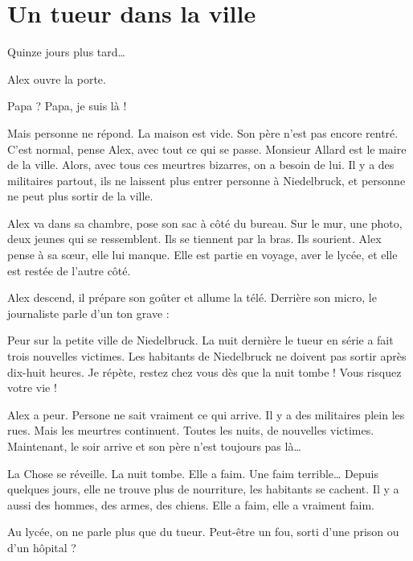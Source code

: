\chapter{Un tueur dans la ville}
Quinze jours plus tard\ldots{}

Alex ouvre la porte.

\og Papa ? Papa, je suis là ! \fg{}

Mais personne ne répond. La maison est vide. Son père n'est pas encore rentré. C'est normal, pense Alex, avec tout ce qui se
passe. Monsieur Allard est le maire de la ville. Alors, avec tous ces meurtres bizarres, on a besoin de lui. Il y a des militaires
partout, ils ne laissent plus entrer personne à Niedelbruck, et personne ne peut plus sortir de la ville.

Alex va dans sa chambre, pose son sac à côté du bureau. Sur le mur, une photo, deux jeunes qui se ressemblent. Ils se tiennent par
la bras. Ils sourient. Alex pense à sa s\oe{}ur, elle lui manque. Elle est partie en voyage, aver le lycée, et elle est restée de
l'autre côté.

Alex descend, il prépare son goûter et allume la télé. Derrière son micro, le journaliste parle d'un ton grave :

\og Peur sur la petite ville de Niedelbruck. La nuit dernière le tueur en série a fait trois nouvelles victimes. Les habitants de
Niedelbruck ne doivent pas sortir après dix-huit heures. Je répète, restez chez vous dès que la nuit tombe ! Vous risquez votre
vie !\fg{}

Alex a peur. Persone ne sait vraiment ce qui arrive. Il y a des militaires plein les rues. Mais les meurtres continuent. Toutes
les nuits, de nouvelles victimes. Maintenant, le soir arrive et son père n'est toujours pas là\ldots{}

La Chose se réveille. La nuit tombe. Elle a faim. Une faim terrible\ldots{} Depuis quelques jours, elle ne trouve plus de
nourriture, les habitants se cachent. Il y a aussi des hommes, des armes, des chiens. Elle a faim, elle a vraiment faim.

Au lycée, on ne parle plus que du tueur. Peut-être un fou, sorti d'une prison ou d'un hôpital ?
